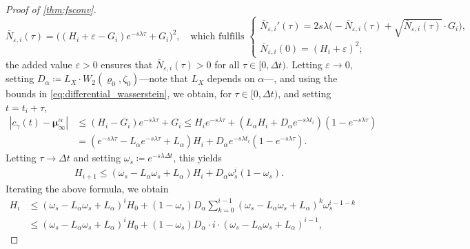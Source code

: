 \documentclass[reqno]{amsart}
\numberwithin{algorithm}{section}
\begin{document}
{\begin{proof}[Proof of \cref{thm:fsconv}]
\begin{equation*}
        \bar{N}_{\varepsilon, i}(\tau) = \bigg((H_i + \varepsilon - G_i)e^{-s\lambda \tau} + G_i\bigg)^2, \quad \text{which fulfills } \begin{cases} \bar{N}_{\varepsilon, i}'(\tau) = 2 s \lambda \Big( - \bar{N}_{\varepsilon, i}(\tau) + \sqrt{\bar{N}_{\varepsilon, i}(\tau)} \cdot G_i \Big), \\ \bar{N}_{\varepsilon, i}(0) = (H_i + \varepsilon)^2;
        \end{cases}
    \end{equation*}
    the added value $\varepsilon > 0$ ensures that $\bar{N}_{\varepsilon, i}(\tau) > 0$ for all $\tau \in [0, \Delta t)$. Letting $\varepsilon \to 0$, setting $D_\alpha \coloneqq L_X \cdot W_2(\varrho_0, \zeta_0)$---note that $L_X$ depends on $\alpha$---, and using the bounds in \cref{eq:differential_wasserstein}, we obtain, for $\tau \in [0, \Delta t)$, and setting $t = t_i + \tau$,
    \begin{equation}\label{eq:79}
        \begin{split}
        |c_\gamma(t) - \boldsymbol\mu_\infty^\alpha| &\leq (H_i - G_i)e^{-s\lambda \tau} + G_i \leq H_i e^{-s\lambda \tau} + (L_\alpha H_i + D_\alpha e^{-s\lambda t_i}) (1 - e^{-s\lambda \tau}) \\
        &= (e^{-s\lambda \tau} - L_\alpha e^{-s \lambda \tau} + L_\alpha) H_i + D_\alpha e^{-s\lambda t_i} (1 - e^{-s\lambda \tau}).
        \end{split}
    \end{equation}
    Letting $\tau \to \Delta t$ and setting $\omega_s \coloneqq e^{-s\lambda\Delta t}$, this yields
    \begin{equation*}
        \begin{split}
            H_{i+1} \leq ( \omega_s - L_\alpha \omega_s + L_\alpha ) H_i + D_\alpha \omega_s^i (1 - \omega_s).
        \end{split}
    \end{equation*}
    Iterating the above formula, we obtain
    \begin{equation}\label{eq:80}
        \begin{split}
            H_{i} &\leq (\omega_s - L_\alpha \omega_s + L_\alpha)^i H_0 + (1 - \omega_s) D_\alpha \sum_{k=0}^{i-1} (\omega_s - L_\alpha \omega_s + L_\alpha)^k \omega_s^{i-1-k} \\
            &\leq (\omega_s - L_\alpha \omega_s + L_\alpha)^i H_0 + (1 - \omega_s) D_\alpha \cdot i \cdot (\omega_s - L_\alpha \omega_s + L_\alpha)^{i-1},
        \end{split}

\end{equation}
\end{proof}}
\end{document}
